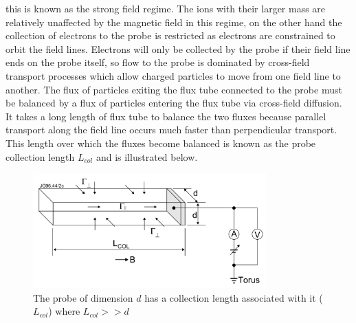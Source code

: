 this is known as the strong field regime. The ions with their larger mass are relatively unaffected by the magnetic field in this regime, on the other hand the collection of electrons to the probe is restricted as electrons are constrained to orbit the field lines. Electrons will only be collected by the probe if their field line ends on the probe itself, so flow to the probe is dominated by cross-field transport processes which allow charged particles to move from one field line to another. The flux of particles exiting the flux tube connected to the probe must be balanced by a flux of particles entering the flux tube via cross-field diffusion. It takes a long length of flux tube to balance the two fluxes because parallel transport along the field line occurs much faster than perpendicular transport. This length over which the fluxes become balanced is known as the probe collection length $L_{col}$ and is illustrated below.

\begin{figure}[H]
	\centering
	\includegraphics[width=0.8\textwidth]{collectionlength}
	\caption{The probe of dimension $d$ has a collection length associated with it ($L_{col}$) where $L_{col}>>d$ \cite{bias-probes}}
	\label{fig:shape}
\end{figure}

